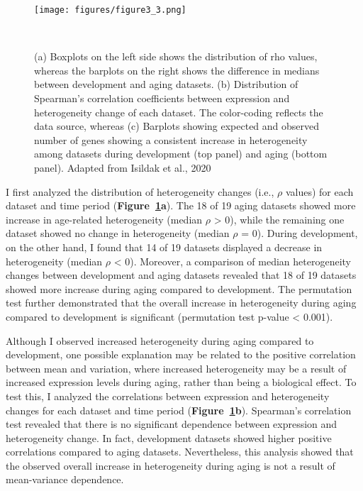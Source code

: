 \begin{figure}[h]
    \centering
    \texttt{[image: figures/figure3\_3.png]}
    \caption{(a) Boxplots on the left side shows the distribution of rho values, 
    whereas the barplots on the right shows the difference in medians between development and aging datasets.
    (b) Distribution of Spearman's correlation coefficients between expression and heterogeneity change of each dataset. 
    The color-coding reflects the data source, whereas 
    (c) Barplots showing expected and observed number of genes showing a consistent increase in heterogeneity among datasets during development (top panel) and aging (bottom panel).
    Adapted from Isildak et al., 2020
    }~\label{fig:fig3.3}
\end{figure}

I first analyzed the distribution of heterogeneity changes (i.e., $\rho$ values) for each dataset and time period (\textbf{Figure~\ref{fig:fig3.3}a}).
The 18 of 19 aging datasets showed more increase in age-related heterogeneity (median $\rho$ > 0), 
while the remaining one dataset showed no change in heterogeneity (median $\rho$ = 0). 
During development, on the other hand, I found that 14 of 19 datasets displayed a decrease in heterogeneity  (median $\rho$ < 0).
Moreover, a comparison of median heterogeneity changes between development and aging datasets revealed that 
18 of 19 datasets showed more increase during aging compared to development. 
The permutation test further demonstrated that the overall increase in heterogeneity during aging compared to development is significant (permutation test p-value < 0.001).

Although I observed increased heterogeneity during aging compared to development, 
one possible explanation may be related to the positive correlation between mean and variation, 
where increased heterogeneity may be a result of increased expression levels during aging, rather than being a biological effect.
To test this, I analyzed the correlations between expression and heterogeneity changes for each dataset and time period (\textbf{Figure~\ref{fig:fig3.3}b}).
Spearman's correlation test revealed that there is no significant dependence between expression and heterogeneity change.
In fact, development datasets showed higher positive correlations compared to aging datasets. 
Nevertheless, this analysis showed that the observed overall increase in heterogeneity during aging is not a result of mean-variance dependence.

